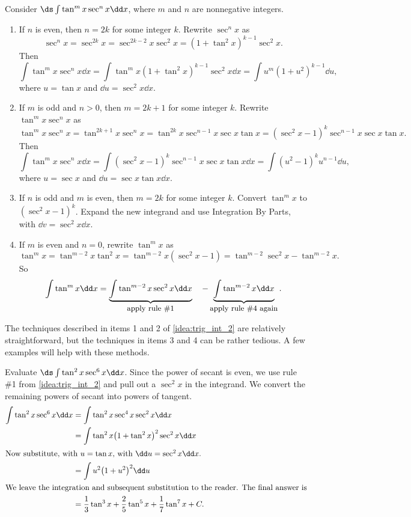 {
\begin{keyidea}\label{idea:trig_int_2}%
Consider $\ds\int\tan^mx\sec^nx\dd x$, where $m$ and $n$ are nonnegative integers.
\begin{enumerate}
\item		If $n$ is even, then $n=2k$ for some integer $k$. Rewrite $\sec^nx$ as 
\[\sec^nx = \sec^{2k}x = \sec^{2k-2}x\sec^2x = (1+\tan^2x)^{k-1}\sec^2x.\]
Then
\[
\int\tan^mx\sec^nx\dd x=\int\tan^mx(1+\tan^2x)^{k-1}\sec^2x\dd x = \int u^m(1+u^2)^{k-1}\dd u,
\]
where $u = \tan x$ and $\dd u = \sec^2x\dd x$.

\item		If $m$ is odd and $n>0$, then $m=2k+1$ for some integer $k$. Rewrite $\tan^mx\sec^nx$ as
\[
\tan^mx\sec^nx = \tan^{2k+1}x\sec^nx = \tan^{2k}x\sec^{n-1}x\sec x\tan x = (\sec^2x-1)^k\sec^{n-1}x\sec x\tan x.
\]
Then
\[
\int\tan^mx\sec^nx\dd x=\int(\sec^2x-1)^k\sec^{n-1}x\sec x\tan x\dd x = \int(u^2-1)^ku^{n-1}\dd u,
\]
where $u = \sec x$ and $\dd u = \sec x\tan x\dd x$.

\item If $n$ is odd and $m$ is even, then $m=2k$ for some integer $k$. Convert $\tan^mx $ to $(\sec^2x-1)^k$. Expand the new integrand and use Integration By Parts, with $\dd v = \sec^2x\dd x$.

\item		If $m$ is even and $n=0$, rewrite $\tan^mx$ as
\[
\tan^mx = \tan^{m-2}x\tan^2x = \tan^{m-2}x(\sec^2x-1) = \tan^{m-2}\sec^2x-\tan^{m-2}x.
\]
So
\[
\int\tan^mx\dd x = \underbrace{\int\tan^{m-2}x\sec^2x\dd x}_{\text{\small apply rule \#1}}\quad - \underbrace{\int\tan^{m-2}x\dd x}_{\text{\small apply rule \#4 again}}.
\]

\end{enumerate}
\end{keyidea}
}

The techniques described in items 1 and 2 of \autoref{idea:trig_int_2} are relatively straightforward, but the techniques in items 3 and 4 can be rather tedious. A few examples will help with these methods.

\begin{example}\label{ex_trigint5}%
Evaluate $\ds\int \tan^2x\sec^6x\dd x$.
\solution
Since the power of secant is even, we use rule \#1 from \autoref{idea:trig_int_2} and pull out a $\sec^2x$ in the integrand. We convert the remaining powers of secant into powers of tangent.
\begin{align*}
\int \tan^2x\sec^6x\dd x &= \int\tan^2x\sec^4x\sec^2x\dd x \\
		&= \int \tan^2x\bigl(1+\tan^2x\bigr)^2\sec^2x\dd x \\
\intertext{Now substitute, with $u=\tan x$, with $\dd u = \sec^2x\dd x$.}
		&=\int u^2\bigl(1+u^2\bigr)^2\dd u\\
\intertext{We leave the integration and subsequent substitution to the reader. The final answer is}
		&=\frac13\tan^3x+\frac25\tan^5x+\frac17\tan^7x+C.
\end{align*}
\end{example}

